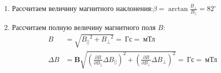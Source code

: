 \documentclass[a4paper, 10pt]{article}
\begin{document}
\begin{enumerate}
    \item Рассчитаем величину магнитного наклонения:$\beta = \arctan{\frac{{B_{\perp}}}{{B_{||}}}} = 82^\circ$
    \item Рассчитаем полную величину магнитного поля ${B}$:
    \begin{align*}
        {B} & = \sqrt{{B_{||}}^{2} + {B_{\perp}}^{2}} = \ \text{Гс} = \ \text{мТл}\\
        \Delta {B} & = \mathbf{B}\sqrt{\left(\frac{\partial {B}}{\partial {B_{||}}}\Delta {B_{||}}\right)^{2} + \left(\frac{\partial {B}}{\partial {B_{\perp}}}\Delta {B_{\perp}}\right)^{2}} = \ \text{Гс} = \ \text{мТл}\\
    \end{align*}
\end{enumerate}
\end{document}
